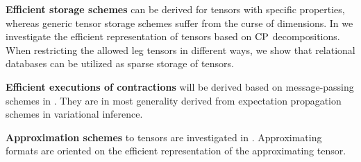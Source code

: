 
\textbf{Efficient storage schemes} can be derived for tensors with specific properties, whereas generic tensor storage schemes suffer from the curse of dimensions.
In  we investigate the efficient representation of tensors based on $\mathrm{CP}$ decompositions.
When restricting the allowed leg tensors in different ways, we show that relational databases can be utilized as sparse storage of tensors.

\textbf{Efficient executions of contractions} will be derived based on message-passing schemes in .
They are in most generality derived from expectation propagation schemes in variational inference.

\textbf{Approximation schemes} to tensors are investigated in .
Approximating formats are oriented on the efficient representation of the approximating tensor.


